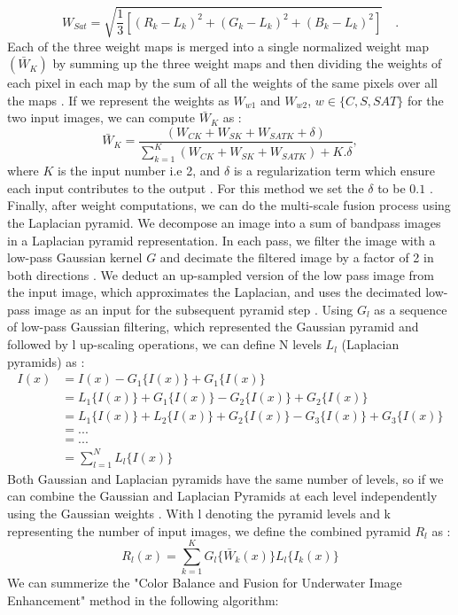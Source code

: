 \documentclass[a4paper,11pt,oneside]{article}
\begin{document}
   $${W}_{Sat}=\sqrt {\frac{1}{3}\left [{(R_{k}\!-\!L_{k})^{2}\!+\!(G_{k}\!-\!L_{k})^{2}\!+\!(B_{k}\!-\!L_{k})^{2}}\right ]}\quad.$$
   Each of the three weight maps is merged into a single normalized weight map $(\bar W_K)$ by summing up the three weight maps and then dividing the weights of each pixel in each map by the sum of all the weights of the same pixels over all the maps \cite{16}. If we represent the weights as $W_{w1}$ and $W_{w2}$, $w \in \{C, S, SAT\}$ for the two input images, we can compute $\bar W_K$ as \cite{16}:
  $$\bar W_K = \frac{(W_{CK} + W_{SK} + W_{SATK} + \delta)}{\sum_{k=1}^{K} (W_{CK} + W_{SK} + W_{SATK}) + K.\delta},$$
  where $K$ is the input number i.e 2, and $\delta$ is a regularization term which ensure each input contributes to the output \cite{16}. For this method we set the $\delta$ to be $0.1$ \cite{16}.\\
  Finally, after weight computations, we can do the multi-scale fusion process using the Laplacian pyramid. We decompose an image into a sum of bandpass images in a Laplacian pyramid representation. In each pass, we filter the image with a low-pass Gaussian kernel $G$ and decimate the filtered image by a factor of 2 in both directions \cite{16}. We deduct an up-sampled version of the low pass image from the input image, which approximates the Laplacian, and uses the decimated low-pass image as an input for the subsequent pyramid step \cite{16}. Using $G_l$ as a sequence of low-pass Gaussian filtering, which represented the Gaussian pyramid and followed by l up-scaling operations, we can define N levels $L_l$ (Laplacian pyramids) as \cite{16}:
  \begin{align*}
  I(x) &= I(x) - G_1\{I(x)\} + G_1\{I(x)\}\\
  &= L_1\{I(x)\} + G_1\{I(x)\} - G_2\{I(x)\} + G_2\{I(x)\}\\
  &= L_1\{I(x)\} + L_2\{I(x)\} + G_2\{I(x)\} - G_3\{I(x)\} + G_3\{I(x)\}\\
  &= ...\\
  &= ...\\
  &= \sum_{l=1}^{N} L_l\{I(x)\}
  \end{align*}
  Both Gaussian and Laplacian pyramids have the same number of levels, so if we can combine the Gaussian and Laplacian Pyramids at each level independently using the Gaussian weights \cite{16}. With l denoting the pyramid levels and k representing the number of input images, we define  the combined pyramid $R_l$ as \cite{16}:
  $$R_l(x) = \sum_{k=1}^K G_l\{\bar W_k(x)\}L_l\{I_k(x)\}$$
  We can summerize the "Color Balance and Fusion for Underwater Image Enhancement" \cite{16} method in the following algorithm:
\end{document}
